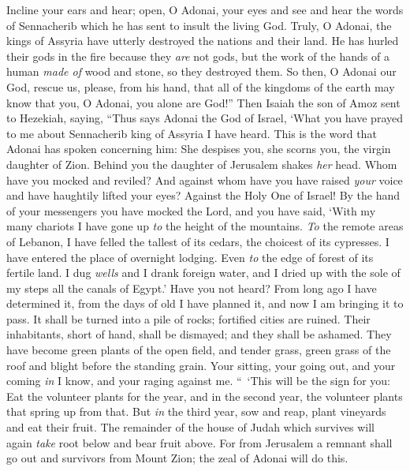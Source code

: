 \begin{biblechapter}
\verse Incline your ears and hear; open, O Adonai, your eyes and see and hear the words of Sennacherib which he has sent to insult the living God.
\verse Truly, O Adonai, the kings of Assyria have utterly destroyed the nations and their land.
\verse He has hurled their gods in the fire because they \textit{are} not gods, but the work of the hands of a human \textit{made of} wood and stone, so they destroyed them.
\verse So then, O Adonai our God, rescue us, please, from his hand, that all of the kingdoms of the earth may know that you, O Adonai, you alone are God!”
 Then Isaiah the son of Amoz sent to Hezekiah, saying, “Thus says Adonai the God of Israel, ‘What you have prayed to me about Sennacherib king of Assyria I have heard.
\verse This is the word that Adonai has spoken concerning him:
\verse She despises you, she scorns you, 
the virgin daughter of Zion. 
Behind you the daughter of Jerusalem 
shakes \textit{her} head.
\verse Whom have you mocked and reviled? 
And against whom have you have raised \textit{your} voice 
and have haughtily lifted your eyes? 
Against the Holy One of Israel!
\verse By the hand of your messengers you have mocked the Lord, 
and you have said, 
‘With my many chariots I have gone up 
\textit{to} the height of the mountains. 
\textit{To} the remote areas of Lebanon, 
I have felled the tallest of its cedars, 
the choicest of its cypresses. 
I have entered the place of overnight lodging. 
Even \textit{to} the edge of forest of its fertile land.
\verse I dug \textit{wells} and I drank foreign water, 
and I dried up with the sole of my steps 
all the canals of Egypt.’
\verse Have you not heard? 
From long ago I have determined it, 
from the days of old I have planned it, 
and now I am bringing it to pass. 
It shall be turned into a pile of rocks; 
fortified cities are ruined.
\verse Their inhabitants, short of hand, shall be dismayed; 
and they shall be ashamed. 
They have become green plants of the open field, 
and tender grass, 
green grass of the roof 
and blight before the standing grain.
\verse Your sitting, your going out, and your coming \textit{in} I know, 
and your raging against me.
\verse “ ‘This will be the sign for you: Eat the volunteer plants for the year, and in the second year, the volunteer plants that spring up from that. But \textit{in} the third year, sow and reap, plant vineyards and eat their fruit.
\verse The remainder of the house of Judah which survives will again \textit{take} root below and bear fruit above.
\verse For from Jerusalem a remnant shall go out and survivors from Mount Zion; the zeal of Adonai will do this.

\end{biblechapter}
